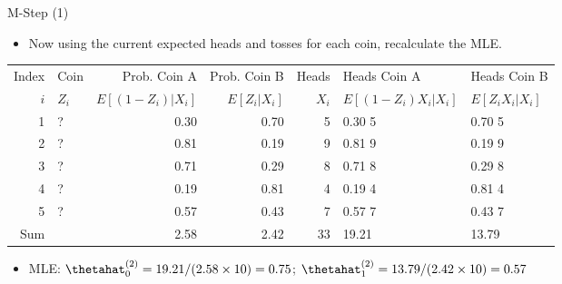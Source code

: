 \documentclass[dvipdfmx,bigger,aspectratio=169]{beamer}
\begin{document}
\begin{frame}[allowframebreaks,label=,t]{M-Step (1)}
\begin{itemize}
\item Now using the current expected heads and tosses for each coin, recalculate the MLE.
\end{itemize}
\footnotesize
\begin{center}
\begin{tabular}{r|l|rr|r|ll|}
Index & Coin & Prob. Coin A & Prob. Coin B & Heads & Heads Coin A & Heads Coin B\\
\(i\) & \(Z_{i}\) & \(E[(1-Z_{i})\vert X_{i}]\) & \(E[Z_{i}\vert X_{i}]\) & \(X_{i}\) & \(E[(1-Z_{i}) X_{i} \vert X_{i}]\) & \(E[Z_{i} X_{i} \vert X_{i}]\)\\
\hline
1 & ? & 0.30 & 0.70 & 5 & 0.30 \texttimes{} 5 & 0.70 \texttimes{} 5\\
2 & ? & 0.81 & 0.19 & 9 & 0.81 \texttimes{} 9 & 0.19 \texttimes{} 9\\
3 & ? & 0.71 & 0.29 & 8 & 0.71 \texttimes{} 8 & 0.29 \texttimes{} 8\\
4 & ? & 0.19 & 0.81 & 4 & 0.19 \texttimes{} 4 & 0.81 \texttimes{} 4\\
5 & ? & 0.57 & 0.43 & 7 & 0.57 \texttimes{} 7 & 0.43 \texttimes{} 7\\
\hline
Sum &  & 2.58 & 2.42 & 33 & 19.21 & 13.79\\
\end{tabular}
\end{center}
\normalsize
\begin{itemize}
\item MLE: \(\thetahat_{0}^{(2)} = 19.21 / (2.58 \times 10) = 0.75\); \(\thetahat_{1}^{(2)} = 13.79 / (2.42 \times 10) = 0.57\)
\end{itemize}
\end{frame}
\end{document}
